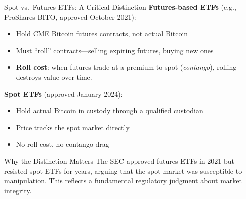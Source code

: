 \documentclass[10pt]{beamer}
\begin{document}
\begin{frame}{Spot vs.\ Futures ETFs: A Critical Distinction}
  \textbf{Futures-based ETFs} (e.g., ProShares BITO, approved October 2021):
  \begin{itemize}
    \item Hold CME Bitcoin futures contracts, not actual Bitcoin
    \item Must ``roll'' contracts---selling expiring futures, buying new ones
    \item \textbf{Roll cost}: when futures trade at a premium to spot (\textit{contango}), rolling destroys value over time.
  \end{itemize}
  
  \vspace{0.5em}
  \textbf{Spot ETFs} (approved January 2024):
  \begin{itemize}
    \item Hold actual Bitcoin in custody through a qualified custodian
    \item Price tracks the spot market directly
    \item No roll cost, no contango drag
  \end{itemize}
  
  \vspace{0.5em}
  \begin{block}{Why the Distinction Matters}
    The SEC approved futures ETFs in 2021 but resisted spot ETFs for years, arguing that the spot market was susceptible to manipulation. This reflects a fundamental regulatory judgment about market integrity.
  \end{block}
\end{frame}
\end{document}
